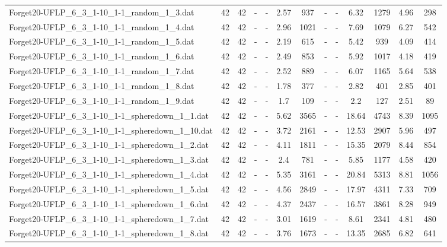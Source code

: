 \begin{table}[!ht]
{\begin{tabular}{lcccccccccccc}
Forget20-UFLP\_6\_3\_1-10\_1-1\_random\_1\_3.dat & 42 & 42 &  - &  - & 2.57 & 937 &  - &  - & 6.32 & 1279 & 4.96 & 298 \\
Forget20-UFLP\_6\_3\_1-10\_1-1\_random\_1\_4.dat & 42 & 42 &  - &  - & 2.96 & 1021 &  - &  - & 7.69 & 1079 & 6.27 & 542 \\
Forget20-UFLP\_6\_3\_1-10\_1-1\_random\_1\_5.dat & 42 & 42 &  - &  - & 2.19 & 615 &  - &  - & 5.42 & 939 & 4.09 & 414 \\
Forget20-UFLP\_6\_3\_1-10\_1-1\_random\_1\_6.dat & 42 & 42 &  - &  - & 2.49 & 853 &  - &  - & 5.92 & 1017 & 4.18 & 419 \\
Forget20-UFLP\_6\_3\_1-10\_1-1\_random\_1\_7.dat & 42 & 42 &  - &  - & 2.52 & 889 &  - &  - & 6.07 & 1165 & 5.64 & 538 \\
Forget20-UFLP\_6\_3\_1-10\_1-1\_random\_1\_8.dat & 42 & 42 &  - &  - & 1.78 & 377 &  - &  - & 2.82 & 401 & 2.85 & 401 \\
Forget20-UFLP\_6\_3\_1-10\_1-1\_random\_1\_9.dat & 42 & 42 &  - &  - & 1.7 & 109 &  - &  - & 2.2 & 127 & 2.51 & 89 \\
Forget20-UFLP\_6\_3\_1-10\_1-1\_spheredown\_1\_1.dat & 42 & 42 &  - &  - & 5.62 & 3565 &  - &  - & 18.64 & 4743 & 8.39 & 1095 \\
Forget20-UFLP\_6\_3\_1-10\_1-1\_spheredown\_1\_10.dat & 42 & 42 &  - &  - & 3.72 & 2161 &  - &  - & 12.53 & 2907 & 5.96 & 497 \\
Forget20-UFLP\_6\_3\_1-10\_1-1\_spheredown\_1\_2.dat & 42 & 42 &  - &  - & 4.11 & 1811 &  - &  - & 15.35 & 2079 & 8.44 & 854 \\
Forget20-UFLP\_6\_3\_1-10\_1-1\_spheredown\_1\_3.dat & 42 & 42 &  - &  - & 2.4 & 781 &  - &  - & 5.85 & 1177 & 4.58 & 420 \\
Forget20-UFLP\_6\_3\_1-10\_1-1\_spheredown\_1\_4.dat & 42 & 42 &  - &  - & 5.35 & 3161 &  - &  - & 20.84 & 5313 & 8.81 & 1056 \\
Forget20-UFLP\_6\_3\_1-10\_1-1\_spheredown\_1\_5.dat & 42 & 42 &  - &  - & 4.56 & 2849 &  - &  - & 17.97 & 4311 & 7.33 & 709 \\
Forget20-UFLP\_6\_3\_1-10\_1-1\_spheredown\_1\_6.dat & 42 & 42 &  - &  - & 4.37 & 2437 &  - &  - & 16.57 & 3861 & 8.28 & 949 \\
Forget20-UFLP\_6\_3\_1-10\_1-1\_spheredown\_1\_7.dat & 42 & 42 &  - &  - & 3.01 & 1619 &  - &  - & 8.61 & 2341 & 4.81 & 480 \\
Forget20-UFLP\_6\_3\_1-10\_1-1\_spheredown\_1\_8.dat & 42 & 42 &  - &  - & 3.76 & 1673 &  - &  - & 13.35 & 2685 & 6.82 & 641 \\

\end{tabular}}
\end{table}
